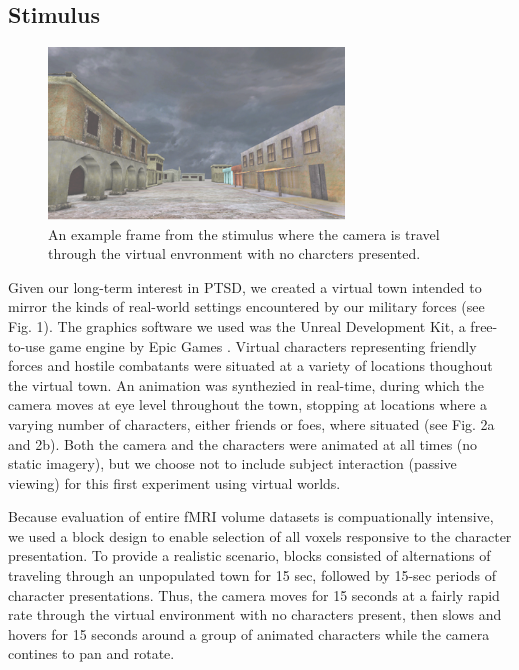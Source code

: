 \documentclass[preprint,5p,authoryear]{elsarticle}
\begin{document}
\subsection{Stimulus}
\begin{figure}
\centering
\includegraphics[width=0.7\textwidth]{figures/stimulus-movement}
\caption{An example frame from the stimulus where the camera is travel through the virtual envronment with no charcters presented.}
\label{fig:stimulus-movement}
\end{figure}
Given our long-term interest in PTSD, we created a virtual town intended to mirror the kinds of real-world settings encountered by our military forces (see Fig. 1).
The graphics software we used was the Unreal Development Kit, a free-to-use game engine by Epic Games  \citep{UnrealEngine2}.
Virtual characters representing friendly forces and hostile combatants were situated at a variety of locations thoughout the virtual town.
An animation was synthezied in real-time, during which the camera moves at eye level throughout the town, stopping at locations where a varying number of characters, either friends or foes, where situated (see Fig. 2a and 2b).
Both the camera and the characters were animated at all times (no static imagery), but we choose not to include subject interaction (passive viewing) for this first experiment using virtual worlds.

Because evaluation of entire fMRI volume datasets is compuationally intensive, we used a block design to enable selection of all voxels responsive to the character presentation.
To provide a realistic scenario, blocks consisted of alternations of traveling through an unpopulated town for 15 sec, followed by 15-sec periods of character presentations.
Thus, the camera moves for 15 seconds at a fairly rapid rate through the virtual environment with no characters present, then slows and hovers for 15 seconds around a group of animated characters while the camera contines to pan and rotate.
\end{document}
